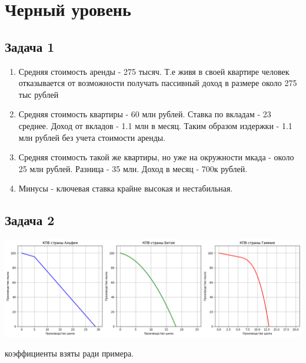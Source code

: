 \documentclass[a4paper,12pt]{article}
\begin{document}
\section{Черный уровень}
\subsection{Задача 1}

\begin{enumerate}
    \item Средняя стоимость аренды - 275 тысяч. Т.е живя в своей квартире человек отказывается от возможности получать пассивный доход в размере около 275 тыс рублей
    \item Средняя стоимость квартиры - 60 млн рублей. Ставка по вкладам - 23 среднее. Доход от вкладов - 1.1 млн в месяц. Таким образом издержки - 1.1 млн рублей без учета стоимости аренды.
    \item Средняя стоимость такой же квартиры, но уже на окружности мкада - около 25 млн рублей. Разница - 35 млн. Доход в месяц - 700к рублей. 
    \item Минусы - ключевая ставка крайне высокая и нестабильная.
\end{enumerate}

\subsection{Задача 2}
\includegraphics[scale=0.45]{graphs/1.1.png}

коэффициенты взяты ради примера.
\end{document}
